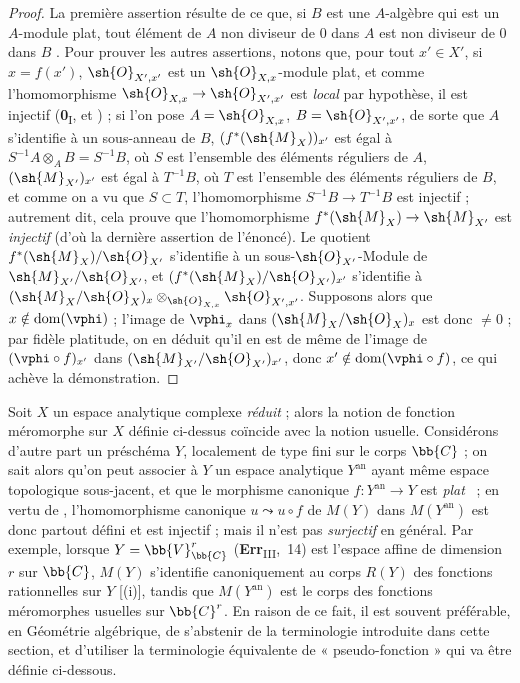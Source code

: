 \begin{proof}
La première assertion résulte de ce que, si $B$ est une $A$-algèbre qui est un $A$-module plat, tout élément de $A$ non diviseur de $0$ dans $A$ est non diviseur de $0$ dans $B$ .
Pour prouver les autres assertions, notons que, pour tout $x'\in X'$, si $x=f(x')$, $\sh{O}_{X',x'}$ est un $\sh{O}_{X,x}$-module plat, et comme l'homomorphisme $\sh{O}_{X,x}\to\sh{O}_{X',x'}$ est \emph{local} par hypothèse, il est injectif (\textbf{0}\textsubscript{I},  et ) ; si l'on pose $A=\sh{O}_{X,x}$, $B=\sh{O}_{X',x'}$, de sorte que $A$ s'identifie à un sous-anneau de $B$, $(f^*(\sh{M}_X))_{x'}$ est égal à $S^{-1}A\otimes_A B=S^{-1}B$, où $S$ est l'ensemble des éléments réguliers de $A$, $(\sh{M}_{X'})_{x'}$ est égal à $T^{-1}B$, où $T$ est l'ensemble
des éléments réguliers de $B$, et comme on a vu que $S\subset T$, l'homomorphisme $S^{-1}B\to T^{-1}B$ est injectif ; autrement dit, cela prouve que l'homomorphisme  $f^*(\sh{M}_X)\to\sh{M}_{X'}$ est \emph{injectif} (d'où la dernière assertion de l'énoncé).
Le quotient $f^*(\sh{M}_X)/\sh{O}_{X'}$ s'identifie à un sous-$\sh{O}_{X'}$-Module de $\sh{M}_{X'}/\sh{O}_{X'}$, et $(f^*(\sh{M}_X)/\sh{O}_{X'})_{x'}$ s'identifie à $(\sh{M}_X/\sh{O}_X)_x\otimes_{\sh{O}_{X,x}}\sh{O}_{X',x'}$.
Supposons alors que $x\notin\operatorname{dom}(\vphi)$ ; l'image de $\vphi_x$ dans $(\sh{M}_X/\sh{O}_X)_x$ est donc $\neq0$ ; par fidèle platitude, on en déduit qu'il en est de même de l'image de $(\vphi\circ f)_{x'}$ dans $(\sh{M}_{X'}/\sh{O}_{X'})_{x'}$, donc $x'\notin\operatorname{dom}(\vphi\circ f)$, ce qui achève la démonstration.
\end{proof}

\begin{remark}[20.1.13]
\label{IV.20.1.13}
Soit $X$ un espace analytique complexe \emph{réduit} ; alors la notion de fonction méromorphe sur $X$ définie ci-dessus coïncide avec la notion usuelle.
Considérons d'autre part un préschéma $Y$, localement de type fini sur le corps $\bb{C}$ ; on sait alors qu'on peut associer à $Y$ un espace analytique $Y^\mathrm{an}$ ayant même espace topologique sous-jacent, et que le morphisme canonique $f:Y^\mathrm{an}\to Y$ est \emph{plat}~\cite{IV-37} ; en vertu de , l'homomorphisme canonique $u\leadsto u\circ f$ de $M(Y)$ dans $M(Y^\mathrm{an})$ est donc partout défini et est injectif ; mais il n'est pas \emph{surjectif} en général.
Par exemple, lorsque $Y=\bb{V}_{\bb{C}}^r$ (\textbf{Err}\textsubscript{III},~14) est l'espace affine de dimension $r$ sur $\bb{C}$, $M(Y)$ s'identifie canoniquement au corps $R(Y)$ des fonctions rationnelles sur $Y$ [(i)], tandis que $M(Y^\mathrm{an})$ est le corps des fonctions méromorphes usuelles sur $\bb{C}^r$.
En raison de ce fait, il est souvent préférable, en Géométrie algébrique, de s'abstenir de la terminologie introduite dans cette section, et d'utiliser la terminologie équivalente de « pseudo-fonction » qui va être définie ci-dessous.
\end{remark}


